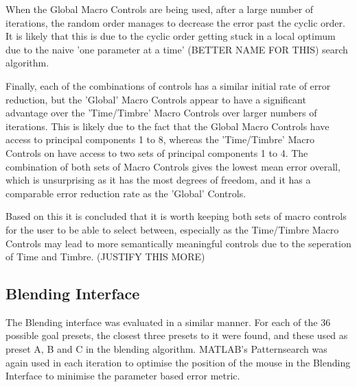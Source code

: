 \documentclass[11pt, oneside]{report}   	%
\begin{document}
When the Global Macro Controls are being used, after a large number of iterations, the random order manages to decrease the error past the cyclic order. It is likely that this is due to the cyclic order getting stuck in a local optimum due to the naive 'one parameter at a time' (BETTER NAME FOR THIS) search algorithm.

Finally, each of the combinations of controls has a similar initial rate of error reduction, but the 'Global' Macro Controls appear to have a significant advantage over the 'Time/Timbre' Macro Controls over larger numbers of iterations. This is likely due to the fact that the Global Macro Controls have access to principal components 1 to 8, whereas the 'Time/Timbre' Macro Controls on have access to two sets of principal components 1 to 4. The combination of both sets of Macro Controls gives the lowest mean error overall, which is unsurprising as it has the most degrees of freedom, and it has a comparable error reduction rate as the 'Global' Controls.

Based on this it is concluded that it is worth keeping both sets of macro controls for the user to be able to select between, especially as the Time/Timbre Macro Controls may lead to more semantically meaningful controls due to the seperation of Time and Timbre. (JUSTIFY THIS MORE)

\subsection{Blending Interface} \label{sec:BlendingEval}
The Blending interface was evaluated in a similar manner. For each of the 36 possible goal presets, the closest three presets to it were found, and these used as preset A, B and C in the blending algorithm. MATLAB's Patternsearch was again used in each iteration to optimise the position of the mouse in the Blending Interface to minimise the parameter based error metric. 
\end{document}
